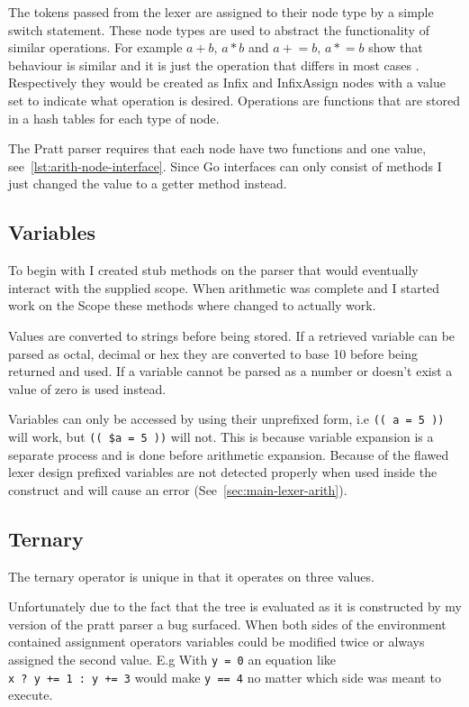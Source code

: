 The tokens passed from the lexer are assigned to their node type by a simple switch statement.
These node types are used to abstract the functionality of similar operations.
For example $a + b$, $a * b$ and $a \mathrel{+}= b$, $a \mathrel{*}= b$ show that behaviour is similar and it is just the operation that differs in most cases .
Respectively they would be created as Infix and InfixAssign nodes with a value set to indicate what operation is desired.
Operations are functions that are stored in a hash tables for each type of node.

The Pratt parser requires that each node have two functions and one value, see~\ref{lst:arith-node-interface}.
Since Go interfaces can only consist of methods I just changed the value to a getter method instead.

\subsection{Variables}
To begin with I created stub methods on the parser that would eventually interact with the supplied scope.
When arithmetic was complete and I started work on the Scope these methods where changed to actually work.

Values are converted to strings before being stored.
If a retrieved variable can be parsed as octal, decimal or hex they are converted to base 10 before being returned and used.
If a variable cannot be parsed as a number or doesn't exist a value of zero is used instead.

Variables can only be accessed by using their unprefixed form, i.e \verb!(( a = 5 ))! will work, but \verb!(( $a = 5 ))! will not.
This is because variable expansion is a separate process and is done before arithmetic expansion.
Because of the flawed lexer design prefixed variables are not detected properly when used inside the construct and will cause an error (See~\ref{sec:main-lexer-arith}).

\subsection{Ternary}
The ternary operator is unique in that it operates on three values.

Unfortunately due to the fact that the tree is evaluated as it is constructed by my version of the pratt parser a bug surfaced.
When both sides of the environment contained assignment operators variables could be modified twice or always assigned the second value.
E.g With \verb!y = 0! an equation like \\ \verb!x ? y += 1 : y += 3! would make \verb!y == 4! no matter which side was meant to execute.

